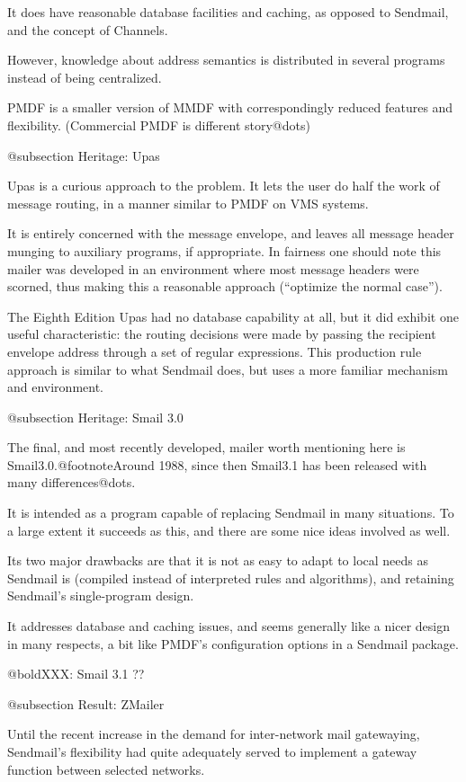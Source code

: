 It does have reasonable database facilities and caching,
as opposed to Sendmail, and the concept of Channels.

However, knowledge about address semantics is distributed in
several programs instead of being centralized.

PMDF is a smaller version of MMDF with correspondingly reduced
features and flexibility. (Commercial PMDF is different story@dots{})


@subsection Heritage: Upas

Upas is a curious approach to the problem.
It lets the user do half the work of message routing, in
a manner similar to PMDF on VMS systems.

It is entirely concerned with the message envelope, and
leaves all message header munging to auxiliary programs,
if appropriate.
In fairness one should note this mailer was developed in
an environment where most message headers were scorned,
thus making this a reasonable approach (``optimize the normal case'').

The Eighth Edition Upas had no database capability at all,
but it did exhibit one useful characteristic: the routing
decisions were made by passing the recipient envelope address
through a set of regular expressions.
This production rule approach is similar to what Sendmail does,
but uses a more familiar mechanism and environment.

@subsection Heritage: Smail 3.0

The final, and most recently developed, mailer worth mentioning
here is Smail3.0.@footnote{Around 1988, since then Smail3.1 has
been released with many differences@dots{}}.

It is intended as a program capable of replacing Sendmail in
many situations.
To a large extent it succeeds as this, and there are some nice
ideas involved as well.

Its two major drawbacks are that it is not as easy to adapt to
local needs as Sendmail is (compiled instead of interpreted
rules and algorithms), and retaining Sendmail's single-program
design.

It addresses database and caching issues, and seems generally
like a nicer design in many respects, a bit like PMDF's
configuration options in a Sendmail package.

@bold{XXX: Smail 3.1 ??}

@subsection Result: ZMailer

Until the recent increase in the demand for inter-network mail
gatewaying, Sendmail's flexibility had quite adequately served
to implement a gateway function between selected networks.

